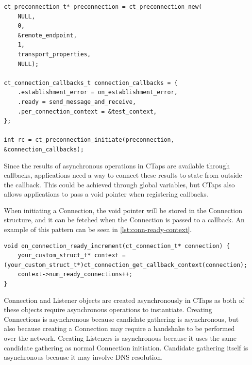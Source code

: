 \begin{listing}[htbp]
    \begin{verbatim}
ct_preconnection_t* preconnection = ct_preconnection_new(
    NULL,
    0,
    &remote_endpoint,
    1,
    transport_properties,
    NULL);

ct_connection_callbacks_t connection_callbacks = {
    .establishment_error = on_establishment_error,
    .ready = send_message_and_receive,
    .per_connection_context = &test_context,
};

int rc = ct_preconnection_initiate(preconnection, &connection_callbacks);
    \end{verbatim}
    \caption[Preconnection initiation flow]{Example flow registering callbacks when initiating a Preconnection.}
    \label{lst:preconnection-init-flow}
\end{listing}

Since the results of asynchronous operations in CTaps are available through callbacks,
applications need a way to connect these results to state from outside the
callback. This could be achieved through global variables, but CTaps 
also allows applications to pass a void pointer when registering callbacks.

When initiating a Connection, the void pointer will be stored in the Connection
structure, and it can be fetched when the Connection is passed
to a callback. An example of this pattern can
be seen in \cref{lst:conn-ready-context}.

\begin{listing}[htbp]
  \begin{verbatim}
void on_connection_ready_increment(ct_connection_t* connection) {
    your_custom_struct_t* context = (your_custom_struct_t*)ct_connection_get_callback_context(connection);
    context->num_ready_connections++;
}
  \end{verbatim}
  \caption[Connection callback context]
{
    Example of accessing user context in a Connection ready callback.
}
  \label{lst:conn-ready-context}
\end{listing}

Connection and Listener
objects are created asynchronously in CTaps as
both of these objects require asynchronous operations
to instantiate.
Creating Connections is asynchronous
because candidate gathering is asynchronous, but
also because creating a Connection may require a handshake to be performed
over the network. Creating Listeners is asynchronous because it uses the
same candidate gathering as normal Connection initiation. Candidate
gathering itself is asynchronous because it may
involve DNS resolution.

